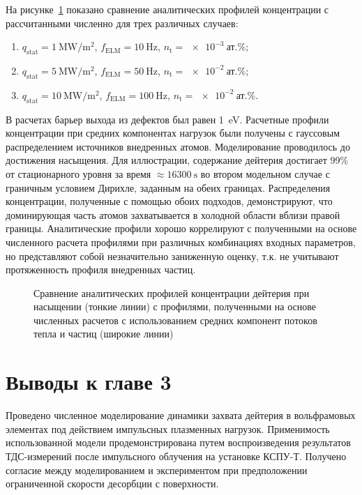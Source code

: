 На рисунке~\cref{fig:ch3/retention_saturation} показано сравнение аналитических профилей концентрации с рассчитанными численно для трех различных случаев:
\begin{enumerate}[beginpenalty=10000]
	\item $q_{\mathrm{stat}}=\SI{1}{\mega\watt\per\meter\squared}$, $f_{\mathrm{ELM}}=\SI{10}{\hertz}$, $n_{\mathrm{t}}=\SI{e-3}{\text{ат.}\percent}$;
	\item $q_{\mathrm{stat}}=\SI{5}{\mega\watt\per\meter\squared}$, $f_{\mathrm{ELM}}=\SI{50}{\hertz}$, $n_{\mathrm{t}}=\SI{e-2}{\text{ат.}\percent}$;
	\item $q_{\mathrm{stat}}=\SI{10}{\mega\watt\per\meter\squared}$, $f_{\mathrm{ELM}}=\SI{100}{\hertz}$, $n_{\mathrm{t}}=\SI{e-2}{\text{ат.}\percent}$.	
\end{enumerate}
В расчетах барьер выхода из дефектов был равен \SI{1}{\electronvolt}. Расчетные профили концентрации при средних компонентах нагрузок были получены с гауссовым распределением источников внедренных атомов. Моделирование проводилось до достижения насыщения. Для иллюстрации, содержание дейтерия достигает 99\% от стационарного уровня за время $\approx\SI{16300}{\second}$ во втором модельном случае с граничным условием Дирихле, заданным на обеих границах. Распределения концентрации, полученные с помощью обоих подходов, демонстрируют, что доминирующая часть атомов захватывается в холодной области вблизи правой границы. Аналитические профили хорошо коррелируют с полученными на основе численного расчета профилями при различных комбинациях входных параметров, но представляют собой незначительно заниженную оценку, т.к. не учитывают протяженность профиля внедренных частиц. 

\begin{figure}[ht]
	\caption{Сравнение аналитических профилей концентрации дейтерия при насыщении (тонкие линии) с профилями, полученными на основе численных расчетов с использованием средних компонент потоков тепла и частиц (широкие линии)}\label{fig:ch3/retention_saturation}
\end{figure}


\section{Выводы к главе 3}
Проведено численное моделирование динамики захвата дейтерия в вольфрамовых элементах под действием импульсных плазменных нагрузок. Применимость использованной модели продемонстрирована путем воспроизведения результатов ТДС-измерений после импульсного облучения на установке КСПУ-Т. Получено согласие между моделированием и экспериментом при предположении ограниченной скорости десорбции с поверхности.   


